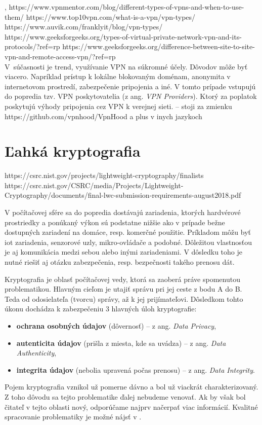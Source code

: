  
\cite{divvpn}, \cite{ciscovpn}
https://www.vpnmentor.com/blog/different-types-of-vpns-and-when-to-use-them/
https://www.top10vpn.com/what-is-a-vpn/vpn-types/
https://www.auvik.com/franklyit/blog/vpn-types/
https://www.geeksforgeeks.org/types-of-virtual-private-network-vpn-and-its-protocols/?ref=rp
https://www.geeksforgeeks.org/difference-between-site-to-site-vpn-and-remote-access-vpn/?ref=rp
\\
V~súčasnosti je trend, využívanie VPN na súkromné účely. Dôvodov môže byť viacero. Napríklad prístup k lokálne blokovaným doménam, anonymita v internetovom prostredí, zabezpečenie pripojenia a iné. V tomto prípade vstupujú do popredia tzv. VPN poskytovatelia (z ang. \textit{VPN Providers}). Ktorý za poplatok poskytujú výhody pripojenia cez VPN k verejnej sieti.
-- stoji za zmienku \\
https://github.com/vpnhood/VpnHood a plus v inych jazykoch 

\chapter{Ľahká kryptografia}\label{krypto}
https://csrc.nist.gov/projects/lightweight-cryptography/finalists 
\\https://csrc.nist.gov/CSRC/media/Projects/Lightweight-Cryptography/documents/final-lwc-submission-requirements-august2018.pdf

V počítačovej sfére sa do popredia dostávajú zariadenia, ktorých hardvérové prostriedky a ponúkaný výkon sú podstatne nižšie ako v prípade bežne dostupných zariadení na domáce, resp. komerčné použitie. Príkladom môžu byť \acrshort{iot} zariadenia, senzorové uzly, mikro-ovládače a podobné. Dôležitou vlastnosťou je aj komunikácia medzi sebou alebo inými zariadeniami. V dôsledku toho je nutné riešiť aj otázku zabezpečenia, resp. bezpečnosti takého prenosu dát. 

Kryptografia je oblasť počítačovej vedy, ktorá sa zaoberá práve spomenutou problematikou. Hlavným cieľom je utajiť správu pri jej ceste z bodu A do B. Teda od odosielateľa (tvorcu) správy, až k jej prijímateľovi. Dôsledkom tohto úkonu dochádza k zabezpečeniu 3 hlavných úloh kryptografie:
\begin{itemize}
	\item \textbf{ochrana osobných údajov} (dôvernosť) -- z ang. \textit{Data Privacy}, 
	\item \textbf{autenticita údajov} (prišla z miesta, kde sa uvádza)  -- z ang. \textit{Data Authenticity},
	\item \textbf{integrita údajov} (nebolia upravená počas prenosu)  -- z ang. \textit{Data Integrity}.
\end{itemize} 
Pojem kryptografia vznikol už pomerne dávno a bol už viackrát charakterizovaný. Z toho dôvodu sa tejto problematike ďalej nebudeme venovať. Ak by však bol čitateľ v tejto oblasti nový, odporúčame najprv načerpať viac informácií. Kvalitné spracovanie problematiky je možné nájsť v \cite{levicky}. 

